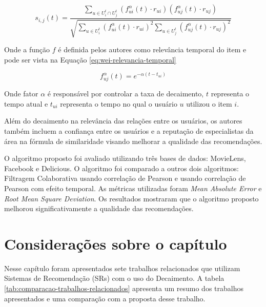 \begin{equation}
  \label{eq:wei-similaridade}
  s_{i,j}(t) = \frac{\sum_{u \in U_i^t \cap U_j^t}{(f_{ui}^\alpha(t) \cdot r_{ui})(f_{uj}^\alpha(t) \cdot r_{uj})}}{\sqrt{\sum_{u \in U_i^t}{(f_{ui}^\alpha(t) \cdot r_{ui})}^2 \sum_{u \in U_j^t}{(f_{uj}^\alpha(t) \cdot r_{uj})}^2}}
\end{equation}

Onde a função $f$ é definida pelos autores como relevância temporal do item e pode ser vista na Equação \ref{eq:wei-relevancia-temporal}

\begin{equation}
  \label{eq:wei-relevancia-temporal}
  f_{uj}^\alpha(t) = e^{- \alpha (t - t_{ui})}
\end{equation}

Onde fator $\alpha$ é responsável por controlar a taxa de decaimento, $t$ representa o tempo atual e $t_{ui}$ representa
o tempo no qual o usuário $u$ utilizou o item $i$.

Além do decaimento na relevância das relações entre os usuários, os autores também incluem a confiança entre os
usuários e a reputação de especialistas da área na fórmula de similaridade visando melhorar a qualidade das
recomendações.

O algoritmo proposto foi avaliado utilizando três bases de dados: MovieLens, Facebook e Delicious. O algoritmo foi
comparado a outros dois algoritmos: Filtragem Colaborativa usando correlação de Pearson e usando correlação de Pearson
com efeito temporal. As métricas utilizadas foram \textit{Mean Absolute Error} e \textit{Root Mean Square Deviation}.
Os resultados mostraram que o algoritmo proposto melhorou significativamente a qualidade das recomendações.

\section{Considerações sobre o capítulo}

Nesse capítulo foram apresentados sete trabalhos relacionados que utilizam Sistemas de Recomendação (SRs) com o uso do
Decaimento. A tabela \ref{tab:comparacao-trabalhos-relacionados} apresenta um resumo dos trabalhos apresentados e uma comparação com
a proposta desse trabalho.

